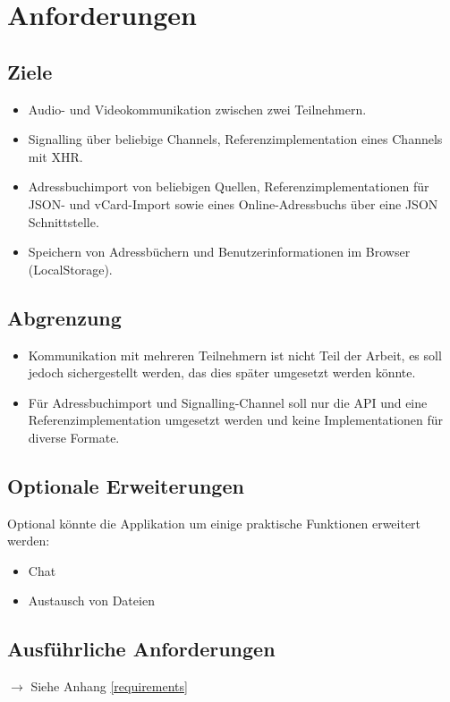 \chapter{Anforderungen}
	\section{Ziele}
		\begin{itemize}
			\item Audio- und Videokommunikation zwischen zwei Teilnehmern.
			\item Signalling über beliebige Channels, Referenzimplementation eines
			Channels mit XHR.
			\item Adressbuchimport von beliebigen Quellen, Referenzimplementationen für
			JSON- und vCard-Import sowie eines Online-Adressbuchs über eine JSON
			Schnittstelle.
			\item Speichern von Adressbüchern und Benutzerinformationen im Browser (LocalStorage).
		\end{itemize}

	
	\section{Abgrenzung}
		\begin{itemize}
			\item Kommunikation mit mehreren Teilnehmern ist nicht Teil der Arbeit, es soll jedoch sichergestellt werden, das dies später umgesetzt werden könnte.
			\item Für Adressbuchimport und Signalling-Channel soll nur die API und eine
			Referenzimplementation umgesetzt werden und keine Implementationen für diverse Formate.
		\end{itemize}
		
	\section{Optionale Erweiterungen}
		Optional könnte die Applikation um einige praktische Funktionen erweitert werden:		
		\begin{itemize}
			\item Chat
			\item Austausch von Dateien
		\end{itemize}
		
	\section{Ausführliche Anforderungen}
		$\rightarrow$ Siehe Anhang \ref{requirements}